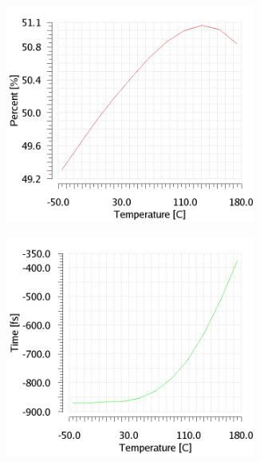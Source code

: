 \begin{figure}[htp]
    \centering
    \begin{subfigure}[b]{0.32\textwidth}
        \includegraphics[width=0.9\textwidth]{Chapter5/Figs/lvds/DutyCycle.png}
    \end{subfigure}
    \begin{subfigure}[b]{0.32\textwidth}
        \includegraphics[width=0.9\textwidth]{Chapter5/Figs/lvds/PeriodJitter.png}
    \end{subfigure}
    \begin{subfigure}[b]{0.32\textwidth}

\end{subfigure}
\end{figure}
